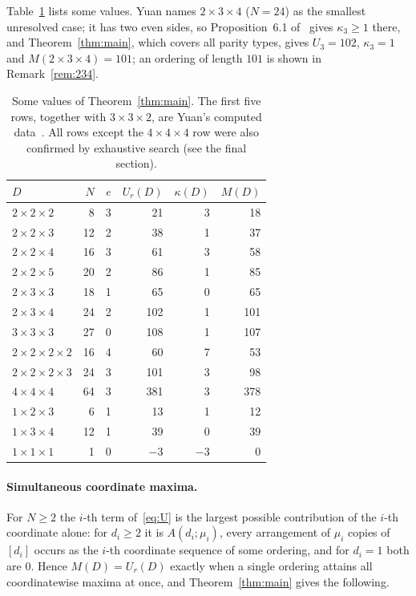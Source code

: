 \documentclass[11pt]{article}
\theoremstyle{remark}
\begin{document}
Table~\ref{tab:values} lists some values. Yuan names $2\times3\times4$ ($N=24$)
as the smallest unresolved case; it has two even sides, so
Proposition~6.1 of~\cite{yuan} gives $\kappa_3\ge1$ there, and
Theorem~\ref{thm:main}, which covers all parity types, gives $U_3=102$, $\kappa_3=1$ and
$M(2\times3\times4)=101$; an ordering of length $101$ is shown in
Remark~\ref{rem:234}.

\begin{table}[ht]
\centering
\begin{tabular}{lrrrrr}
\toprule
$D$ & $N$ & $e$ & $U_r(D)$ & $\kappa(D)$ & $M(D)$\\
\midrule
$2\times2\times2$ & 8 & 3 & 21 & 3 & 18\\
$2\times2\times3$ & 12 & 2 & 38 & 1 & 37\\
$2\times2\times4$ & 16 & 3 & 61 & 3 & 58\\
$2\times2\times5$ & 20 & 2 & 86 & 1 & 85\\
$2\times3\times3$ & 18 & 1 & 65 & 0 & 65\\
$2\times3\times4$ & 24 & 2 & 102 & 1 & 101\\
$3\times3\times3$ & 27 & 0 & 108 & 1 & 107\\
$2\times2\times2\times2$ & 16 & 4 & 60 & 7 & 53\\
$2\times2\times2\times3$ & 24 & 3 & 101 & 3 & 98\\
$4\times4\times4$ & 64 & 3 & 381 & 3 & 378\\
$1\times2\times3$ & 6 & 1 & 13 & 1 & 12\\
$1\times3\times4$ & 12 & 1 & 39 & 0 & 39\\
$1\times1\times1$ & 1 & 0 & $-3$ & $-3$ & 0\\
\bottomrule
\end{tabular}
\caption{Some values of Theorem~\ref{thm:main}. The first five rows, together
with $3\times3\times2$, are Yuan's computed data~\cite{yuan}. All rows except the
$4\times4\times4$ row were also confirmed by exhaustive search
(see the final section).}\label{tab:values}
\end{table}

\paragraph{Simultaneous coordinate maxima.}
For $N\ge2$ the $i$-th term of~\eqref{eq:U} is the largest possible
contribution of the $i$-th coordinate alone: for $d_i\ge2$ it is
$A(d_i;\mu_i)$, every arrangement of $\mu_i$ copies of $[d_i]$ occurs as the
$i$-th coordinate sequence of some ordering, and for $d_i=1$ both are $0$.
Hence $M(D)=U_r(D)$ exactly when a single ordering attains all coordinatewise
maxima at once, and Theorem~\ref{thm:main} gives the following.
\end{document}
